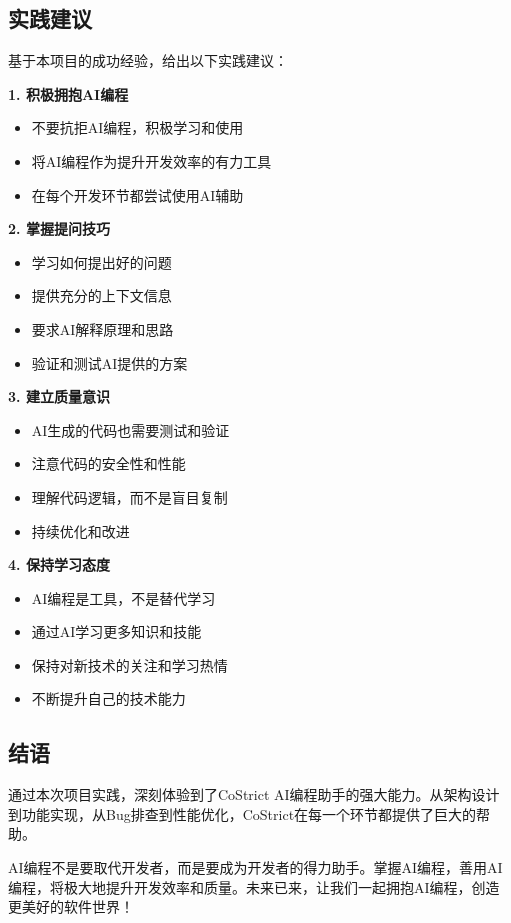 \documentclass[12pt,a4paper]{article}
\begin{document}

\subsection{实践建议}

基于本项目的成功经验，给出以下实践建议：

\textbf{1. 积极拥抱AI编程}

\begin{itemize}
    \item 不要抗拒AI编程，积极学习和使用
    \item 将AI编程作为提升开发效率的有力工具
    \item 在每个开发环节都尝试使用AI辅助
\end{itemize}

\textbf{2. 掌握提问技巧}

\begin{itemize}
    \item 学习如何提出好的问题
    \item 提供充分的上下文信息
    \item 要求AI解释原理和思路
    \item 验证和测试AI提供的方案
\end{itemize}

\textbf{3. 建立质量意识}

\begin{itemize}
    \item AI生成的代码也需要测试和验证
    \item 注意代码的安全性和性能
    \item 理解代码逻辑，而不是盲目复制
    \item 持续优化和改进
\end{itemize}

\textbf{4. 保持学习态度}

\begin{itemize}
    \item AI编程是工具，不是替代学习
    \item 通过AI学习更多知识和技能
    \item 保持对新技术的关注和学习热情
    \item 不断提升自己的技术能力
\end{itemize}

\subsection{结语}

通过本次项目实践，深刻体验到了CoStrict AI编程助手的强大能力。从架构设计到功能实现，从Bug排查到性能优化，CoStrict在每一个环节都提供了巨大的帮助。

AI编程不是要取代开发者，而是要成为开发者的得力助手。掌握AI编程，善用AI编程，将极大地提升开发效率和质量。未来已来，让我们一起拥抱AI编程，创造更美好的软件世界！
\end{document}
